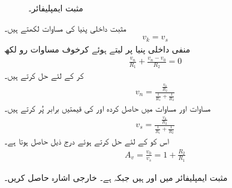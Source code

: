 \begin{figure}
\centering
{}
\caption{مثبت ایمپلیفائر۔}
\label{شکل_حسابی_مثبت_ایمپلیفائر}
\end{figure}
مثبت داخلی پنیا کی مساوات لکھتے ہیں۔
\begin{align}\label{مساوات_حسابی_مثبت_ایمپلیفائر_الف}
v_k=v_s
\end{align}
منفی داخلی پنیا پر  لیتے ہوئے  کرخوف مساوات رو لکھ
\begin{align*}
\frac{v_n}{R_1}+\frac{v_n-v_0}{R_2}=0
\end{align*}
کر  کے لئے حل کرتے ہیں۔
\begin{align}\label{مساوات_حسابی_مثبت_ایمپلیفائر_ب}
v_n=\frac{\frac{v_0}{R_2}}{\frac{1}{R_1}+\frac{1}{R_2}}
\end{align}
مساوات  اور مساوات  میں حاصل کردہ  اور  کی قیمتیں برابر پُر کرتے ہیں۔
\begin{align*}
v_s=\frac{\frac{v_0}{R_2}}{\frac{1}{R_1}+\frac{1}{R_2}}
\end{align*}
اس کو  کے لئے حل کرتے ہوئے درج ذیل حاصل ہوتا ہے۔
\begin{align}\label{مساوات_حسابی_مثبت_ایمپلیفائر_افزائش}
A_v=\frac{v_0}{v_s}=1+\frac{R_2}{R_1}
\end{align}

مثبت ایمپلیفائر میں  اور  ہیں جبکہ  ہے۔ خارجی اشارہ حاصل کریں۔


